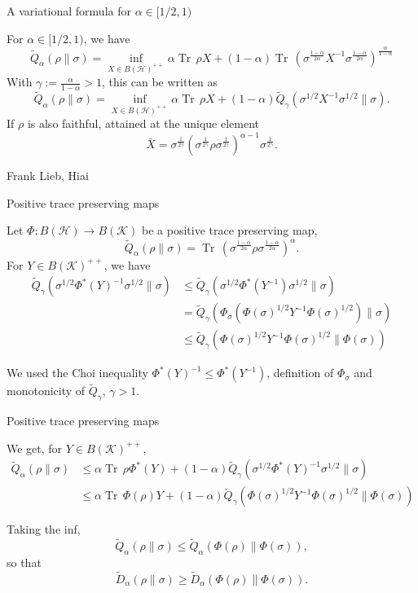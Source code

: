 \documentclass[mathserif]{beamer}
\newcommand{\<}{\langle}
\renewcommand{\>}{\rangle}
\newcommand{\Tr}{\operatorname{Tr}\,}
\newcommand{\Ha}{\mathcal H}
\newcommand{\Ka}{\mathcal K}
\begin{document}
\begin{frame}{A variational formula for $\alpha\in [1/2,1)$}

For $\alpha\in [1/2,1)$, we have 
\[
\tilde Q_\alpha(\rho\|\sigma)=\inf_{X\in B(\Ha)^{++}} \alpha \Tr \rho X +(1-\alpha)\Tr
\left(\sigma^{\frac{1-\alpha}{2\alpha}}X^{-1}\sigma^{\frac{1-\alpha}{2\alpha}}\right)^{\frac{\alpha}{1-\alpha}}
\]
With $\gamma:=\frac{\alpha}{1-\alpha}>1$, this can be written as
\[
\tilde Q_\alpha(\rho\|\sigma)=\inf_{X\in B(\Ha)^{++}} \alpha \Tr \rho X +(1-\alpha)\tilde
Q_\gamma(\sigma^{1/2}X^{-1}\sigma^{1/2}\|\sigma).
\]
If $\rho$ is also faithful, attained at the unique element
\[
\bar X=\sigma^{\frac{1}{2\gamma}}(\sigma^{\frac{1}{2\gamma}}\rho\sigma^{\frac{1}{2\gamma}})^{\alpha-1}\sigma^{\frac{1}{2\gamma}}.
\]


Frank Lieb, Hiai


\end{frame}


\begin{frame}{Positive trace preserving maps}

Let $\Phi: B(\Ha)\to B(\Ka)$ be  a positive trace preserving map,
\[
\tilde
Q_\alpha(\rho\|\sigma)=\Tr\left(\sigma^{\frac{1-\alpha}{2\alpha}}\rho\sigma^{\frac{1-\alpha}{2\alpha}}\right)^\alpha.
\]
For $Y\in B(\Ka)^{++}$, we have
\begin{align*}
\tilde Q_\gamma(\sigma^{1/2}\Phi^*(Y)^{-1}\sigma^{1/2}\|\sigma)&\le
\tilde
Q_\gamma(\sigma^{1/2}\Phi^*(Y^{-1})\sigma^{1/2}\|\sigma)\\ &=\tilde
Q_\gamma(\Phi_\sigma(\Phi(\sigma)^{1/2}Y^{-1}\Phi(\sigma)^{1/2})\|\sigma)\\
&\le \tilde
Q_\gamma(\Phi(\sigma)^{1/2}Y^{-1}\Phi(\sigma)^{1/2}\|\Phi(\sigma))
\end{align*}

We used the Choi inequality $\Phi^*(Y)^{-1}\le \Phi^*(Y^{-1})$, definition of
$\Phi_\sigma$ and monotonicity of $\tilde Q_\gamma$, $\gamma>1$.

\end{frame}

\begin{frame}{Positive trace preserving maps}

We get, for $Y\in B(\Ka)^{++}$,
\begin{align*}
\tilde Q_\alpha(\rho\|\sigma)&\le \alpha \Tr \rho\Phi^*(Y)+(1-\alpha)\tilde
Q_\gamma(\sigma^{1/2}\Phi^*(Y)^{-1}\sigma^{1/2}\|\sigma)\\
&\le  \alpha\Tr\Phi(\rho)Y+(1-\alpha)\tilde
Q_\gamma(\Phi(\sigma)^{1/2}Y^{-1}\Phi(\sigma)^{1/2}\|\Phi(\sigma))
\end{align*}

Taking the inf,
\[
\tilde Q_\alpha(\rho\|\sigma)\le \tilde Q_\alpha(\Phi(\rho)\|\Phi(\sigma)),
\]
so that
\[
\tilde D_\alpha(\rho\|\sigma)\ge \tilde D_\alpha(\Phi(\rho)\|\Phi(\sigma)).
\]


\end{frame}
\end{document}

